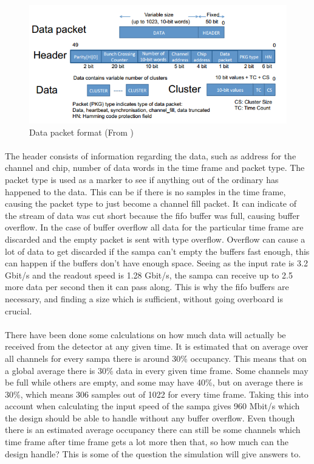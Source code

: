 \documentclass[a4paper]{report}
\begin{document}
\begin{figure}[h!]
	\centering
		\includegraphics[width=1.0\textwidth]{images/packet.png}
		\caption{Data packet format (From \cite{tdr-015})}
		\label{fig:packet}
\end{figure}

\paragraph{}
The header consists of information regarding the data, such as address for the channel and chip, number of data words in the time frame and packet type.
The packet type is used as a marker to see if anything out of the ordinary has happened to the data.
This can be if there is no samples in the time frame, causing the packet type to just become a channel fill packet.
It can indicate of the stream of data was cut short because the \gls{fifo} buffer was full, causing buffer overflow.
In the case of buffer overflow all data for the particular time frame are discarded and the empty packet is sent with type overflow.
Overflow can cause a lot of data to get discarded if the \gls{sampa} can't empty the buffers fast enough, this can happen if the buffers don't have enough space.
Seeing as the input rate is 3.2 Gbit/s and the readout speed is 1.28 Gbit/s, the \gls{sampa} can receive up to 2.5 more data per second then it can pass along.
This is why the \gls{fifo} buffers are necessary, and finding a size which is sufficient, without going overboard is crucial.

\paragraph{}
There have been done some calculations on how much data will actually be received from the detector at any given time.
It is estimated that on average over all channels for every \gls{sampa} there is around 30\% occupancy.
This means that on a global average there is 30\% data in every given time frame.
Some channels may be full while others are empty, and some may have 40\%, but on average there is 30\%, which means 306 samples out of 1022 for every time frame.
Taking this into account when calculating the input speed of the \gls{sampa} gives 960 Mbit/s which the design should be able to handle without any buffer overflow.
Even though there is an estimated average occupancy there can still be some channels which time frame after time frame gets a lot more then that, so how much can the design handle?
This is some of the question the simulation will give answers to.
\end{document}
